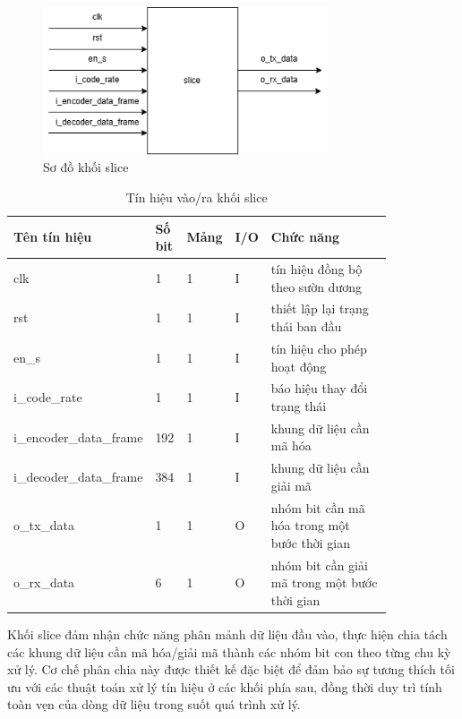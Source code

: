 \documentclass[../DoAn.tex]{subfiles}
\begin{document}
\begin{figure}[H]
    \centering
    \includegraphics[width=0.75\textwidth, height=0.15\textheight, keepaspectratio]{Hinhve/Chuong 4/slice.png}
    \caption{Sơ đồ khối slice}
\end{figure}

\begin{table}[H]
\centering{}
    \caption{Tín hiệu vào/ra khối slice}
    \begin{tabular}{|p{0.28\linewidth}|p{0.08\linewidth}|p{0.08\linewidth}|p{0.05\linewidth}|p{0.35\linewidth}|}
        \hline
        \textbf{Tên tín hiệu} & \textbf{Số bit}  & \textbf{Mảng}     & \textbf{I/O}   & \textbf{Chức năng} \\ \hline\hline
        clk  & 1   & 1     & I     & tín hiệu đồng bộ theo sườn dương \\ \hline
        rst   & 1   & 1     & I     & thiết lập lại trạng thái ban đầu\\ \hline
        en\_s        & 1   & 1     & I     & tín hiệu cho phép hoạt động \\ \hline
        i\_code\_rate  & 1   & 1     & I     & báo hiệu thay đổi trạng thái \\ \hline
        i\_encoder\_data\_frame  & 192   & 1     & I     & khung dữ liệu cần mã hóa \\ \hline
        i\_decoder\_data\_frame  & 384   & 1     & I     & khung dữ liệu cần giải mã \\ \hline
        o\_tx\_data  & 1   & 1     & O     & nhóm bit cần mã hóa trong một bước thời gian \\ \hline
        o\_rx\_data  & 6   & 1     & O     & nhóm bit cần giải mã trong một bước thời gian \\ \hline
        \end{tabular}
\end{table}

Khối slice đảm nhận chức năng phân mảnh dữ liệu đầu vào, thực hiện chia tách các khung dữ liệu cần mã hóa/giải mã thành các nhóm bit con theo từng chu kỳ xử lý. Cơ chế phân chia này được thiết kế đặc biệt để đảm bảo sự tương thích tối ưu với các thuật toán xử lý tín hiệu ở các khối phía sau, đồng thời duy trì tính toàn vẹn của dòng dữ liệu trong suốt quá trình xử lý.
\end{document}
